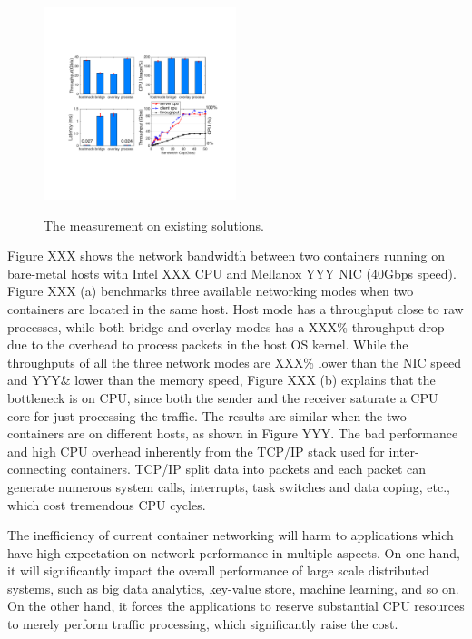 \begin{figure}[ht]
     \centering 
     \includegraphics[width=0.5\textwidth]{figures/intro/intro_exist.pdf} 
     \label{fig:intro_exist}
     \caption{The measurement on existing solutions.} 
\end{figure} 

Figure XXX shows
the network bandwidth between two containers running on bare-metal hosts with 
Intel XXX CPU and Mellanox YYY NIC (40Gbps speed). Figure XXX (a) benchmarks
three available networking modes when two containers are located in the same 
host. Host mode has a throughput close to raw processes, while both bridge
and overlay modes has a XXX\% throughput drop due to the overhead to 
process packets in the host OS kernel. While the throughputs of all the three
network modes are XXX\% lower than the NIC speed and YYY\& lower than the memory
speed, Figure XXX (b) explains that the bottleneck is on CPU, since both
the sender and the receiver saturate a CPU core for just processing the traffic.
The results are similar when the two containers are on different hosts, as shown
in Figure YYY. The bad performance and high CPU overhead inherently from 
the TCP/IP stack used for inter-connecting containers. TCP/IP split data into 
packets and each packet can generate numerous system calls, interrupts, task 
switches and data coping, etc., which cost tremendous CPU cycles.

The inefficiency of current container networking will harm to applications which
have high expectation on network performance in multiple aspects. On one hand,
it will significantly impact the overall performance of large scale distributed systems, such as big data analytics, key-value store, machine learning, and so on.
On the other hand, it forces the applications to reserve substantial CPU
resources to merely perform traffic processing, which significantly raise the 
cost.

